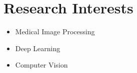 \documentclass[letterpaper,11pt]{article}
\newcommand{\resumeSubHeadingListStart}{\begin{itemize}[leftmargin=0.0in, label={}]}
\newcommand{\resumeSubHeadingListEnd}{\end{itemize}}
\begin{document}
\section{Research Interests}
        \begin{multicols}{3}
            \begin{itemize}[itemsep=-5pt, parsep=3pt]
                \item Medical Image Processing
                \item Deep Learning
                \item Computer Vision
            \end{itemize}
        \end{multicols}
        \vspace*{2.0\multicolsep}

\end{document}
